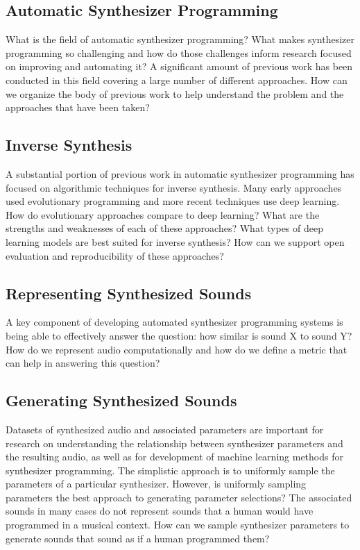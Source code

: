 \subsection{Automatic Synthesizer Programming}
What is the field of automatic synthesizer programming? What makes synthesizer programming so challenging and how do those challenges inform research focused on improving and automating it? A significant amount of previous work has been conducted in this field covering a large number of different approaches. How can we organize the body of previous work to help understand the problem and the approaches that have been taken?

\subsection{Inverse Synthesis}
A substantial portion of previous work in automatic synthesizer programming has focused on algorithmic techniques for inverse synthesis. Many early approaches used evolutionary programming and more recent techniques use deep learning. How do evolutionary approaches compare to deep learning? What are the strengths and weaknesses of each of these approaches? What types of deep learning models are best suited for inverse synthesis? How can we support open evaluation and reproducibility of these approaches?

\subsection{Representing Synthesized Sounds}
A key component of developing automated synthesizer programming systems is being able to effectively answer the question: how similar is sound X to sound Y? How do we represent audio computationally and how do we define a metric that can help in answering this question?

\subsection{Generating Synthesized Sounds}
Datasets of synthesized audio and associated parameters are important for research on understanding the relationship between synthesizer parameters and the resulting audio, as well as for development of machine learning methods for synthesizer programming. The simplistic approach is to uniformly sample the parameters of a particular synthesizer. However, is uniformly sampling parameters the best approach to generating parameter selections? The associated sounds in many cases do not represent sounds that a human would have programmed in a musical context. How can we sample synthesizer parameters to generate sounds that sound as if a human programmed them?

